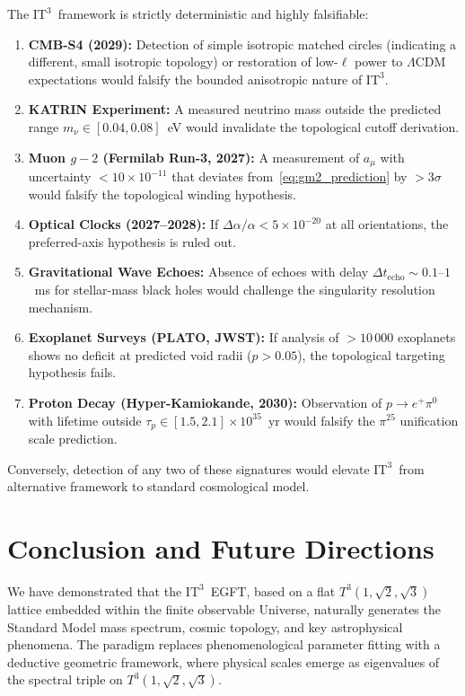 \documentclass[onecolumn,aps,prd,superscriptaddress,nofootinbib,amsmath,amssymb]{revtex4-2}
\theoremstyle{definition}
\theoremstyle{remark}
\newcommand{\ITthree}{\ensuremath{\mathrm{IT}^3}}
\newcommand{\Tthree}{T^3(1,\sqrt{2},\sqrt{3})}
\begin{document}
The \ITthree\ framework is strictly deterministic and highly falsifiable:

\begin{enumerate}
\item \textbf{CMB-S4 (2029):} Detection of simple isotropic matched circles (indicating a different, small isotropic topology) or restoration of low-$\ell$ power to $\Lambda$CDM expectations would falsify the bounded anisotropic nature of \ITthree.
\item \textbf{KATRIN Experiment:} A measured neutrino mass outside the predicted range $m_\nu \in [0.04, 0.08]$~eV would invalidate the topological cutoff derivation.
\item \textbf{Muon $g-2$ (Fermilab Run-3, 2027):} A measurement of $a_\mu$ with uncertainty $< 10 \times 10^{-11}$ that deviates from~\eqref{eq:gm2_prediction} by $> 3\sigma$ would falsify the topological winding hypothesis.
\item \textbf{Optical Clocks (2027--2028):} If $\Delta \alpha / \alpha < 5 \times 10^{-20}$ at all orientations, the preferred-axis hypothesis is ruled out.
\item \textbf{Gravitational Wave Echoes:} Absence of echoes with delay $\Delta t_{\text{echo}} \sim 0.1$--$1$~ms for stellar-mass black holes would challenge the singularity resolution mechanism.
\item \textbf{Exoplanet Surveys (PLATO, JWST):} If analysis of $>10\,000$ exoplanets shows no deficit at predicted void radii ($p > 0.05$), the topological targeting hypothesis fails.
\item \textbf{Proton Decay (Hyper-Kamiokande, 2030):} Observation of $p \to e^+ \pi^0$ with lifetime outside $\tau_p \in [1.5, 2.1] \times 10^{35}$~yr would falsify the $\pi^{25}$ unification scale prediction.
\end{enumerate}

Conversely, detection of any two of these signatures would elevate \ITthree\ from alternative framework to standard cosmological model.

\section{Conclusion and Future Directions}
\label{sec:conclusion}

We have demonstrated that the \ITthree\ EGFT, based on a flat $\Tthree$ lattice embedded within the finite observable Universe, naturally generates the Standard Model mass spectrum, cosmic topology, and key astrophysical phenomena. The paradigm replaces phenomenological parameter fitting with a deductive geometric framework, where physical scales emerge as eigenvalues of the spectral triple on $\Tthree$.
\end{document}
